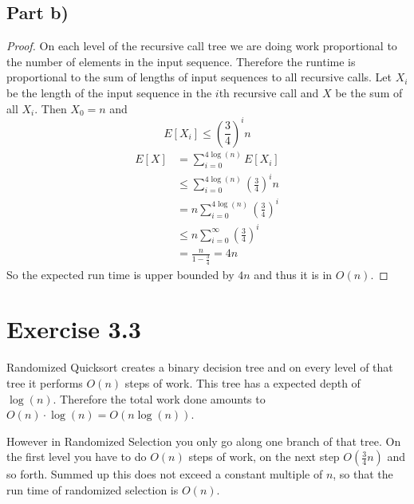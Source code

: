 \documentclass[10pt,a4paper]{article}
\begin{document}
\subsection*{Part b)}

\begin{proof}
  On each level of the recursive call tree we are doing work proportional to the number of elements in the input sequence.
  Therefore the runtime is proportional to the sum of lengths of input sequences to all recursive calls.
  Let $X_{i}$ be the length of the input sequence in the $i$th recursive call and $X$ be the sum of all $X_{i}$.
  Then $X_{0} = n$ and
  \begin{equation*}
    E[X_{i}] \le \left( \frac{3}{4} \right)^{i} n
  \end{equation*}
  \begin{align*}
    E[X] & = \sum_{i = 0}^{4 \log(n)} E[X_{i}]\\
         & \le \sum_{i = 0}^{4 \log(n)} \left( \frac{3}{4} \right)^{i} n\\
         & = n \sum_{i = 0}^{4 \log(n)} \left( \frac{3}{4} \right)^{i}\\
         & \le n \sum_{i = 0}^{\infty} \left( \frac{3}{4} \right)^{i}\\
         & = \frac{n}{1 - \frac{3}{4}} = 4n
  \end{align*}
  So the expected run time is upper bounded by $4n$ and thus it is in $O(n)$.
\end{proof}

\section*{Exercise 3.3}

Randomized Quicksort creates a binary decision tree and on every level of that tree it performs $O(n)$ steps of work.
This tree has a expected depth of $\log(n)$.
Therefore the total work done amounts to $O(n) \cdot \log(n) = O(n \log(n))$.

However in Randomized Selection you only go along one branch of that tree.
On the first level you have to do $O(n)$ steps of work, on the next step $O\left( \frac{3}{4}n \right)$ and so forth.
Summed up this does not exceed a constant multiple of $n$, so that the run time of randomized selection is $O(n)$.
\end{document}
